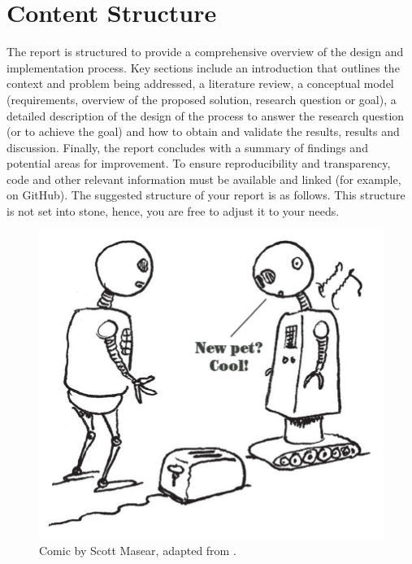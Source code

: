 \documentclass[conference]{IEEEtran}
\begin{document}
\section{Content Structure}
\label{sec:Content}

\noindent The report is structured to provide a comprehensive overview of the design and implementation process. Key sections include an introduction that outlines the context and problem being addressed, a literature review, a conceptual model (requirements, overview of the proposed solution, research question or goal), a detailed description of the design of the process to answer the research question (or to achieve the goal) and how to obtain and validate the results, results and discussion. Finally, the report concludes with a summary of findings and potential areas for improvement. To ensure reproducibility and transparency, code and other relevant information must be available and linked (for example, on GitHub). The suggested structure of your report is as follows. This structure is not set into stone, hence, you are free to adjust it to your needs. 


\begin{figure}[b]
  \centering
  \includegraphics[width=0.7\columnwidth]{toasterpet.jpg}
  \caption{Comic by Scott Masear, adapted from \label{comic}\cite{joke}.}
\end{figure}
\end{document}
